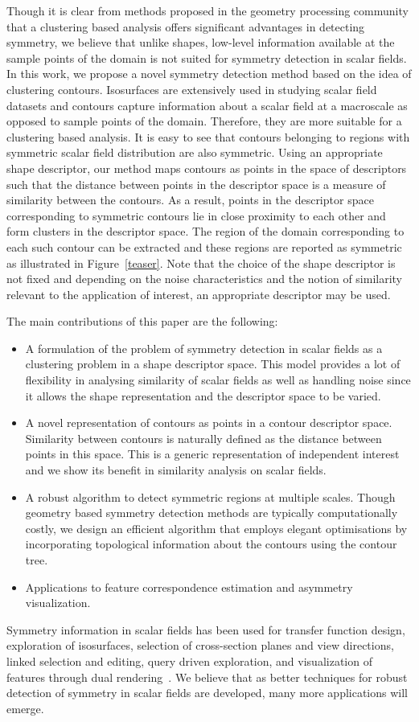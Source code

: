 \documentclass[review,journal]{vgtc}         %
\begin{document}
Though it is clear from methods proposed in the geometry processing community
that a clustering based analysis offers significant advantages in detecting symmetry,
we believe that unlike shapes, low-level information available at the sample points of the 
domain is not suited for symmetry detection in scalar fields. In this work, we propose 
a novel symmetry detection method based on the idea of clustering contours. Isosurfaces
are extensively used in studying scalar field datasets and contours capture information 
about a scalar field at a macroscale as opposed to sample points of the domain. Therefore, they
are more suitable for a clustering based analysis. It is easy to see that contours
belonging to regions with symmetric scalar field distribution are also symmetric. Using an 
appropriate shape descriptor, our method maps contours as points in the space of descriptors 
such that the distance between points in the descriptor space is a measure of similarity 
between the contours. As a result, points in the descriptor space 
corresponding to symmetric contours lie in close 
proximity to each other and form clusters in the descriptor space. The region of the domain
corresponding to each such contour can be extracted and these regions
are reported as symmetric as illustrated in Figure~\ref{teaser}. Note that the choice
of the shape descriptor is not fixed and depending on the noise characteristics and the notion
of similarity relevant to the application of interest, an appropriate descriptor may be used.

The main contributions of this paper are the following:
\begin{itemize}
\item A formulation of the problem of symmetry detection in scalar fields
as a clustering problem in a shape descriptor space. This model
provides a lot of flexibility in analysing similarity of scalar fields
as well as handling noise since it allows the shape representation and the 
descriptor space to be varied.
\item A novel representation of contours as points in a contour descriptor space.
Similarity between contours is naturally defined as the distance between points 
in this space. This is a generic representation of independent interest 
and we show its benefit in similarity analysis on scalar fields.
\item A robust algorithm to detect symmetric regions at multiple scales. Though geometry based 
symmetry detection methods are typically computationally costly, we design an efficient algorithm 
that employs elegant optimisations by incorporating topological information 
about the contours using the contour tree.
\item Applications to feature correspondence estimation and asymmetry visualization.
\end{itemize}
Symmetry information in scalar fields
has been used for transfer function design, exploration of isosurfaces, selection of cross-section
planes and view directions, linked selection and editing, query driven exploration,
and visualization of features through dual rendering~\cite{ThomN11,HongS08,ThomN13,MasoodTN13}.
We believe that as better techniques for robust detection of symmetry in scalar fields are developed,
many more applications will emerge.
\end{document}
